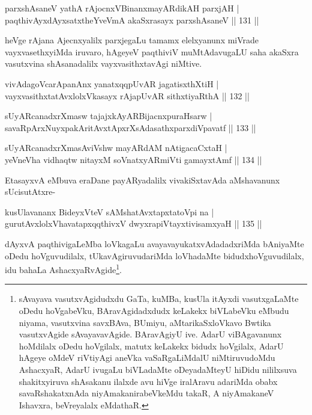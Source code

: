 \begin{shl}
parxshAsaneV yathA rAjocnxV\s BinanxmayARdikAH parxjAH |\\
paqthivAyxdAyxsatxtheYveVmA akaSxrasayx parxshAsaneV \hfill || 131 ||
\end{shl}

\begin{artha}
heVge rAjana Ajecnxyalilx parxjegaLu tamamx elelxyanunx miVrade vayxvasethxyiMda iruvaro, hAgeyeV paqthiviV muMtAdavugaLU saha akaSxra vasutxvina shAsanadalilx vayxvasithxtavAgi niMtive.
\end{artha}


\begin{shl}
vivAdagoVcarApanAnx yanatxqqpUvAR jagatisxthXtiH |\\
vayxvasithxtatAvxlolxVkasayx rAjapUvAR sithxtiyaRthA \hfill || 132 ||
\end{shl}

\begin{shl}
sUyARcanadxrXmasw tajajxkAyARBijacnxpuraHsarw |\\
savaRpArxNuyxpakAritAvxtApxrXsAdasathxparxdiVpavatf \hfill || 133 ||
\end{shl}

\begin{shl}
sUyARcanadxrXmasAviVshw mayARdAM nAtigacaCxtaH |\\
yeVneVha vidhaqtw nitayxM soV\s natxyARmiVti gamayxtAmf \hfill || 134 ||
\end{shl}

\begin{artha}
EtasayxvA eMbuva eraDane payARyadalilx vivakiSxtavAda aMshavanunx sUcisutAtxre-
\end{artha}

\begin{shl}
kusUlavananx BideyxVteV sAMshatAvxtapxtatoV\s pi na |\\
gurutAvxlolxVhavatapxqqthivxV dwyxrapiVtayxtivisamxyaH \hfill || 135 ||
\end{shl}

\begin{artha}%
dAyxvA paqthivigaLeMba loVkagaLu avayavayukatxvAdadadxriMda bAniyaMte oDedu hoVguvudilalx, tUkavAgiruvudariMda loVhadaMte bidudxhoVguvudilalx, idu bahaLa AshacxyaRvAgide\footnote{sAvayava vasutxvAgidudxdu GaTa, kuMBa, kusUla itAyxdi vasutxgaLaMte oDedu hoVgabeVku, BAravAgidadxdudx keLakekx biVLabeVku eMbudu niyama, vasutxvina savxBAva, BUmiyu, aMtarikaSxloVkavo Bwtika vasutxvAgide sAvayavavAgide. BAravAgiyU ive. AdarU viBAgavanunx hoMdilalx oDedu hoVgilalx, matutx keLakekx bidudx hoVgilalx, AdarU hAgeye oMdeV riVtiyAgi aneVka vaSaRgaLiMdalU niMtiruvudoMdu AshacxyaR, AdarU ivugaLu biVLadaMte oDeyadaMteyU hiDidu nililxsuva shakitxyiruva shAsakanu ilalxde avu hiVge iralAravu adariMda obabx savaRshakatxnAda niyAmakanirabeVkeMdu takaR, A niyAmakaneV Ishavxra, beVreyalalx eMdathaR.}.
\end{artha}

